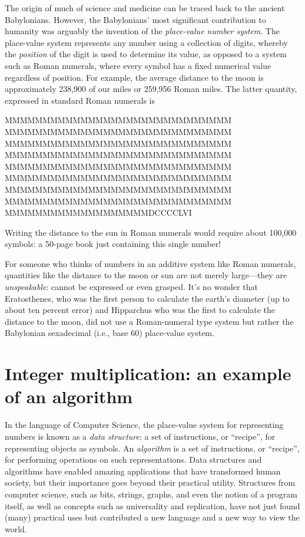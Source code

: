 The origin of much of science and medicine can be traced back to the
ancient Babylonians. However, the Babylonians' most significant
contribution to humanity was arguably the invention of the
\emph{place-value number system}. The place-value system represents any
number using a collection of digits, whereby the \emph{position} of the
digit is used to determine its value, as opposed to a system such as
Roman numerals, where every symbol has a fixed numerical value
regardless of position. For example, the average distance to the moon is
approximately 238,900 of our miles or 259,956 Roman miles. The latter
quantity, expressed in standard Roman numerals is

\begin{code}
MMMMMMMMMMMMMMMMMMMMMMMMMMMMMM
MMMMMMMMMMMMMMMMMMMMMMMMMMMMMM
MMMMMMMMMMMMMMMMMMMMMMMMMMMMMM
MMMMMMMMMMMMMMMMMMMMMMMMMMMMMM
MMMMMMMMMMMMMMMMMMMMMMMMMMMMMM
MMMMMMMMMMMMMMMMMMMMMMMMMMMMMM
MMMMMMMMMMMMMMMMMMMMMMMMMMMMMM
MMMMMMMMMMMMMMMMMMMMMMMMMMMMMM
MMMMMMMMMMMMMMMMMMMDCCCCLVI
\end{code}

Writing the distance to the sun in Roman numerals would require about
100,000 symbols: a 50-page book just containing this single number!

For someone who thinks of numbers in an additive system like Roman
numerals, quantities like the distance to the moon or sun are not merely
large---they are \emph{unspeakable}: cannot be expressed or even
grasped. It's no wonder that Eratosthenes, who was the first person to
calculate the earth's diameter (up to about ten percent error) and
Hipparchus who was the first to calculate the distance to the moon, did
not use a Roman-numeral type system but rather the Babylonian
sexadecimal (i.e., base 60) place-value system.

\section{Integer multiplication: an example of an
algorithm}\label{Integer-multiplication-an}

In the language of Computer Science, the place-value system for
representing numbers is known as a \emph{data structure}: a set of
instructions, or ``recipe'', for representing objects as symbols. An
\emph{algorithm} is a set of instructions, or ``recipe'', for performing
operations on such representations. Data structures and algorithms have
enabled amazing applications that have transformed human society, but
their importance goes beyond their practical utility. Structures from
computer science, such as bits, strings, graphs, and even the notion of
a program itself, as well as concepts such as universality and
replication, have not just found (many) practical uses but contributed a
new language and a new way to view the world.

